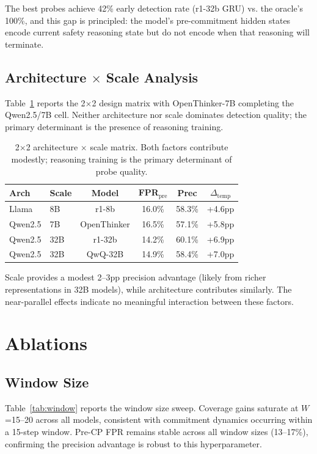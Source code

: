 \documentclass[11pt,a4paper]{article}
\begin{document}
The best probes achieve 42\% early detection rate (r1-32b GRU) vs. the oracle's 100\%, and this gap is principled: the model's pre-commitment hidden states encode current safety reasoning state but do not encode when that reasoning will terminate.

\subsection{Architecture $\times$ Scale Analysis}

Table~\ref{tab:scale} reports the 2$\times$2 design matrix with OpenThinker-7B completing the Qwen2.5/7B cell. Neither architecture nor scale dominates detection quality; the primary determinant is the presence of reasoning training.

\begin{table}[t]
\centering
\small
\caption{2$\times$2 architecture $\times$ scale matrix. Both factors contribute modestly; reasoning training is the primary determinant of probe quality.}
\label{tab:scale}
\begin{tabular}{llcccc}
\toprule
Arch & Scale & Model & FPR$_{\text{pre}}$ & Prec & $\Delta_{\text{temp}}$ \\
\midrule
Llama & 8B & r1-8b & 16.0\% & 58.3\% & +4.6pp \\
Qwen2.5 & 7B & OpenThinker & 16.5\% & 57.1\% & +5.8pp \\
Qwen2.5 & 32B & r1-32b & 14.2\% & 60.1\% & +6.9pp \\
Qwen2.5 & 32B & QwQ-32B & 14.9\% & 58.4\% & +7.0pp \\
\bottomrule
\end{tabular}
\end{table}

Scale provides a modest 2--3pp precision advantage (likely from richer representations in 32B models), while architecture contributes similarly. The near-parallel effects indicate no meaningful interaction between these factors.

\section{Ablations}

\subsection{Window Size}
\label{sec:window_ablation}

Table~\ref{tab:window} reports the window size sweep. Coverage gains saturate at $W$=15--20 across all models, consistent with commitment dynamics occurring within a 15-step window. Pre-CP FPR remains stable across all window sizes (13--17\%), confirming the precision advantage is robust to this hyperparameter.
\end{document}
